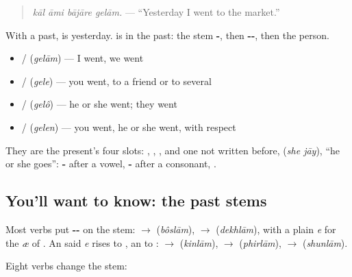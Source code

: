 \begin{quote}
\emph{kāl āmi bājāre gelām.} — \textquotedblleft{}Yesterday I went to the market.\textquotedblright{}
\end{quote}

With a past, \textbf{} is yesterday. \textbf{} is \textbf{} in the past: the stem \textbf{-}, then \textbf{--}, then the person.

\begin{itemize}
\raggedright
  \item \textbf{} / \textbf{} \textbf{} (\emph{gelām}) — I went, we went
  \item \textbf{} / \textbf{} \textbf{} (\emph{gele}) — you went, to a friend or to several
  \item \textbf{} / \textbf{} \textbf{} (\emph{gelô}) — he or she went; they went
  \item \textbf{} / \textbf{} \textbf{} (\emph{gelen}) — you went, he or she went, with respect
\end{itemize}

They are the present's four slots: \textbf{}, \textbf{}, \textbf{}, and one not written before, \textbf{ } (\emph{she jāy}), \textquotedblleft{}he or she goes\textquotedblright{}: \textbf{-} after a vowel, \textbf{-} after a consonant, \textbf{ }.

\subsection*{You'll want to know: the past stems}
Most verbs put \textbf{--} on the stem: \textbf{} $\to$ \textbf{} (\emph{bôslām}), \textbf{} $\to$ \textbf{} (\emph{dekhlām}), with a plain \emph{e} for the \emph{æ} of \textbf{}. An \textbf{} said \emph{e} rises to \textbf{}, an \textbf{} to \textbf{}: \textbf{} $\to$ \textbf{} (\emph{kinlām}), \textbf{} $\to$ \textbf{} (\emph{phirlām}), \textbf{} $\to$ \textbf{} (\emph{shunlām}).

Eight verbs change the stem:

